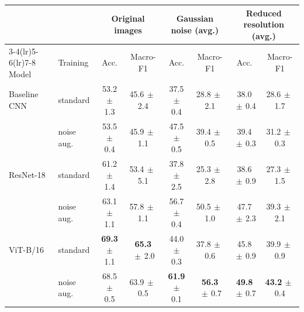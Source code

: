 \begin{tabular}{llcccccc}
\toprule
 & & \multicolumn{2}{c}{Original images} & \multicolumn{2}{c}{Gaussian noise (avg.)} & \multicolumn{2}{c}{Reduced resolution (avg.)} \\
\cmidrule(lr){3-4}\cmidrule(lr){5-6}\cmidrule(lr){7-8}
Model & Training & Acc. & Macro-F1 & Acc. & Macro-F1 & Acc. & Macro-F1 \\
\midrule
Baseline CNN & standard & 53.2{\scriptsize$\,\pm\,$1.3} & 45.6{\scriptsize$\,\pm\,$2.4} & 37.5{\scriptsize$\,\pm\,$0.4} & 28.8{\scriptsize$\,\pm\,$2.1} & 38.0{\scriptsize$\,\pm\,$0.4} & 28.6{\scriptsize$\,\pm\,$1.7} \\
 & noise aug. & 53.5{\scriptsize$\,\pm\,$0.4} & 45.9{\scriptsize$\,\pm\,$1.1} & 47.5{\scriptsize$\,\pm\,$0.5} & 39.4{\scriptsize$\,\pm\,$0.5} & 39.4{\scriptsize$\,\pm\,$0.3} & 31.2{\scriptsize$\,\pm\,$0.3} \\
\addlinespace
ResNet-18 & standard & 61.2{\scriptsize$\,\pm\,$1.4} & 53.4{\scriptsize$\,\pm\,$5.1} & 37.8{\scriptsize$\,\pm\,$2.5} & 25.3{\scriptsize$\,\pm\,$2.8} & 38.6{\scriptsize$\,\pm\,$0.9} & 27.3{\scriptsize$\,\pm\,$1.5} \\
 & noise aug. & 63.1{\scriptsize$\,\pm\,$1.1} & 57.8{\scriptsize$\,\pm\,$1.1} & 56.7{\scriptsize$\,\pm\,$0.4} & 50.5{\scriptsize$\,\pm\,$1.0} & 47.7{\scriptsize$\,\pm\,$2.3} & 39.3{\scriptsize$\,\pm\,$2.1} \\
\addlinespace
ViT-B/16 & standard & \textbf{69.3}{\scriptsize$\,\pm\,$1.1} & \textbf{65.3}{\scriptsize$\,\pm\,$2.0} & 44.0{\scriptsize$\,\pm\,$0.3} & 37.8{\scriptsize$\,\pm\,$0.6} & 45.8{\scriptsize$\,\pm\,$0.9} & 39.9{\scriptsize$\,\pm\,$0.9} \\
 & noise aug. & 68.5{\scriptsize$\,\pm\,$0.5} & 63.9{\scriptsize$\,\pm\,$0.5} & \textbf{61.9}{\scriptsize$\,\pm\,$0.1} & \textbf{56.3}{\scriptsize$\,\pm\,$0.7} & \textbf{49.8}{\scriptsize$\,\pm\,$0.7} & \textbf{43.2}{\scriptsize$\,\pm\,$0.4} \\
\bottomrule
\end{tabular}

